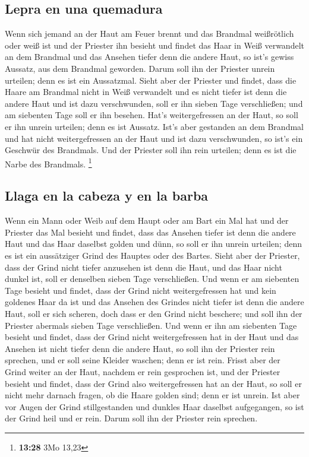 \hypertarget{lepra-en-una-quemadura}{%
\subsection{Lepra en una quemadura}\label{lepra-en-una-quemadura}}

 Wenn sich jemand an der Haut am Feuer brennt und das
Brandmal weißrötlich oder weiß ist  und der Priester ihn
besieht und findet das Haar in Weiß verwandelt an dem Brandmal und das
Ansehen tiefer denn die andere Haut, so ist's gewiss Aussatz, aus dem
Brandmal geworden. Darum soll ihn der Priester unrein urteilen; denn es
ist ein Aussatzmal.  Sieht aber der Priester und findet,
dass die Haare am Brandmal nicht in Weiß verwandelt und es nicht tiefer
ist denn die andere Haut und ist dazu verschwunden, soll er ihn sieben
Tage verschließen;  und am siebenten Tage soll er ihn
besehen. Hat's weitergefressen an der Haut, so soll er ihn unrein
urteilen; denn es ist Aussatz.  Ist's aber gestanden an
dem Brandmal und hat nicht weitergefressen an der Haut und ist dazu
verschwunden, so ist's ein Geschwür des Brandmals. Und der Priester soll
ihn rein urteilen; denn es ist die Narbe des Brandmals. \footnote{\textbf{13:28}
  3Mo 13,23}

\hypertarget{llaga-en-la-cabeza-y-en-la-barba}{%
\subsection{Llaga en la cabeza y en la
barba}\label{llaga-en-la-cabeza-y-en-la-barba}}

 Wenn ein Mann oder Weib auf dem Haupt oder am Bart ein
Mal hat  und der Priester das Mal besieht und findet,
dass das Ansehen tiefer ist denn die andere Haut und das Haar daselbst
golden und dünn, so soll er ihn unrein urteilen; denn es ist ein
aussätziger Grind des Hauptes oder des Bartes.  Sieht
aber der Priester, dass der Grind nicht tiefer anzusehen ist denn die
Haut, und das Haar nicht dunkel ist, soll er denselben sieben Tage
verschließen.  Und wenn er am siebenten Tage besieht und
findet, dass der Grind nicht weitergefressen hat und kein goldenes Haar
da ist und das Ansehen des Grindes nicht tiefer ist denn die andere
Haut,  soll er sich scheren, doch dass er den Grind nicht
beschere; und soll ihn der Priester abermals sieben Tage verschließen.
 Und wenn er ihn am siebenten Tage besieht und findet,
dass der Grind nicht weitergefressen hat in der Haut und das Ansehen ist
nicht tiefer denn die andere Haut, so soll ihn der Priester rein
sprechen, und er soll seine Kleider waschen; denn er ist rein.
 Frisst aber der Grind weiter an der Haut, nachdem er
rein gesprochen ist,  und der Priester besieht und
findet, dass der Grind also weitergefressen hat an der Haut, so soll er
nicht mehr darnach fragen, ob die Haare golden sind; denn er ist unrein.
 Ist aber vor Augen der Grind stillgestanden und dunkles
Haar daselbst aufgegangen, so ist der Grind heil und er rein. Darum soll
ihn der Priester rein sprechen.

